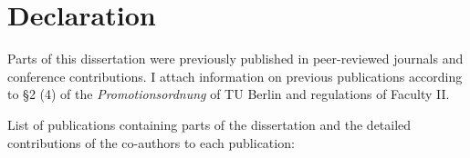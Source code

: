 \noindent
\pagestyle{empty}

\section*{Declaration}

Parts of this dissertation were previously published in peer-reviewed journals and conference contributions. I attach information on previous
publications according to §2 (4) of the \emph{Promotionsordnung} of TU Berlin and regulations of
Faculty II.

\vspace{2ex}

List of publications containing parts of the dissertation and
the detailed contributions of the co-authors to each publication:

